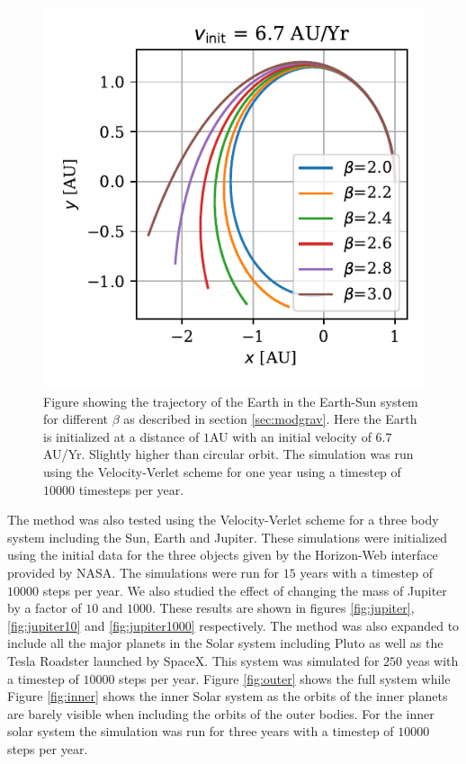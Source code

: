 \documentclass[twocolumn]{aastex62}
\begin{document}
\begin{figure}
\includegraphics[scale=1]{Figures/beta.pdf}
\caption{Figure showing the trajectory of the Earth in the Earth-Sun system for different $\beta$ as described in section \ref{sec:modgrav}. Here the Earth is initialized at a distance of $1$AU with an initial velocity of $6.7$AU/Yr. Slightly higher than circular orbit. The simulation was run using the Velocity-Verlet scheme for one year using a timestep of $10000$ timesteps per year.}
\label{fig:beta}
\end{figure}


The method was also tested using the Velocity-Verlet scheme for a three body system including the Sun, Earth and
Jupiter. These simulations were initialized using the initial data for the three
objects given by the Horizon-Web interface provided by NASA. The simulations
were run for $15$ years with a timestep of $10000$ steps per year. We also
studied the effect of changing the mass of Jupiter by a factor of $10$ and
$1000$. These results are shown in figures \ref{fig:jupiter},
\ref{fig:jupiter10} and \ref{fig:jupiter1000} respectively. The method was also
expanded to include all the major planets in the Solar system including Pluto as
well as the Tesla Roadster launched by SpaceX. This system was simulated for
$250$ yeas with a timestep of $10000$ steps per year. Figure \ref{fig:outer}
shows the full system while Figure \ref{fig:inner} shows the inner Solar system
as the orbits of the inner planets are barely visible when including the orbits
of the outer bodies. For the inner solar system the simulation was run for three
years with a timestep of $10000$ steps per year.
\end{document}
